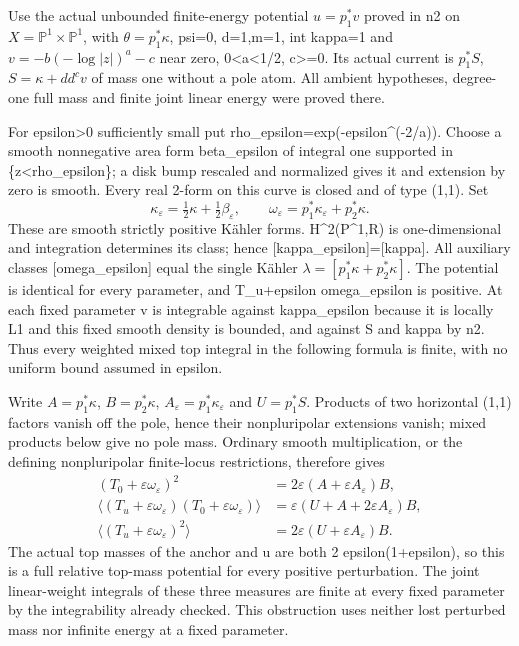 \documentclass[
]{article}
\begin{document}
Use the actual unbounded finite-energy potential \(u=p_1^*v\) proved in
n2 on \(X=\mathbb P^1\times\mathbb P^1\), with \(\theta=p_1^*\kappa\),
psi=0, d=1,m=1, int kappa=1 and \(v=-b(-\log|z|)^a-c\) near zero,
0\textless a\textless1/2, c\textgreater=0. Its actual current is
\(p_1^*S\), \(S=\kappa+dd^c v\) of mass one without a pole atom. All
ambient hypotheses, degree-one full mass and finite joint linear energy
were proved there.

For epsilon\textgreater0 sufficiently small put
rho\_epsilon=exp(-epsilon\^{}(-2/a)). Choose a smooth nonnegative area
form beta\_epsilon of integral one supported in
\{\textbar z\textbar\textless rho\_epsilon\}; a disk bump rescaled and
normalized gives it and extension by zero is smooth. Every real 2-form
on this curve is closed and of type (1,1). Set \[
\kappa_\varepsilon=\tfrac12\kappa+\tfrac12\beta_\varepsilon,
\qquad \omega_\varepsilon=p_1^*\kappa_\varepsilon+p_2^*\kappa.
\] These are smooth strictly positive Kähler forms. H\^{}2(P\^{}1,R) is
one-dimensional and integration determines its class; hence
{[}kappa\_epsilon{]}={[}kappa{]}. All auxiliary classes
{[}omega\_epsilon{]} equal the single Kähler
\(\lambda=[p_1^*\kappa+p_2^*\kappa]\). The potential is identical for
every parameter, and T\_u+epsilon omega\_epsilon is positive. At each
fixed parameter v is integrable against kappa\_epsilon because it is
locally L1 and this fixed smooth density is bounded, and against S and
kappa by n2. Thus every weighted mixed top integral in the following
formula is finite, with no uniform bound assumed in epsilon.

Write \(A=p_1^*\kappa\), \(B=p_2^*\kappa\),
\(A_\varepsilon=p_1^*\kappa_\varepsilon\) and \(U=p_1^*S\). Products of
two horizontal (1,1) factors vanish off the pole, hence their
nonpluripolar extensions vanish; mixed products below give no pole mass.
Ordinary smooth multiplication, or the defining nonpluripolar
finite-locus restrictions, therefore gives \[
\begin{aligned}
(T_0+\varepsilon\omega_\varepsilon)^2&=2\varepsilon(A+\varepsilon A_\varepsilon)B,\\
\langle(T_u+\varepsilon\omega_\varepsilon)(T_0+\varepsilon\omega_\varepsilon)\rangle
&=\varepsilon(U+A+2\varepsilon A_\varepsilon)B,\\
\langle(T_u+\varepsilon\omega_\varepsilon)^2\rangle
&=2\varepsilon(U+\varepsilon A_\varepsilon)B.
\end{aligned}
\] The actual top masses of the anchor and u are both 2
epsilon(1+epsilon), so this is a full relative top-mass potential for
every positive perturbation. The joint linear-weight integrals of these
three measures are finite at every fixed parameter by the integrability
already checked. This obstruction uses neither lost perturbed mass nor
infinite energy at a fixed parameter.
\end{document}

